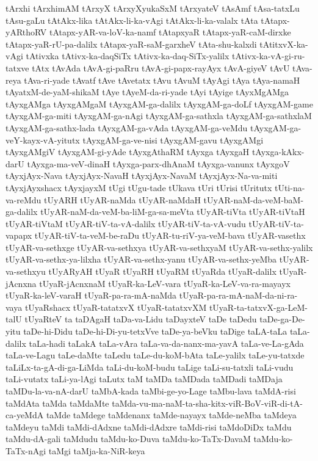 {tArxhi
tArxhimAM
tArxyX
tArxyXyukaSxM
tArxyateV
tAsAmf
tAsa-tatxLu
tAsu-gaLu
tAtAkx-lika
tAtAkx-li-ka-vAgi
tAtAkx-li-ka-valalx
tAta
tAtapx-yARthoRV
tAtapx-yAR-va-loV-ka-namf
tAtapxyaR
tAtapx-yaR-caM-dirxke
tAtapx-yaR-rU-pa-dalilx
tAtapx-yaR-saM-garxheV
tAta-shu-kalxdi
tAtitxvX-ka-vAgi
tAtivxka
tAtivx-ka-daqSiTx
tAtivx-ka-daq-SiTx-yalilx
tAtivx-ka-vA-gi-ru-tatxve
tAtx
tAvAda
tAvA-gi-paRru
tAvA-gi-papx-rayAyx
tAvA-giyeV
tAvU
tAva-reya
tAva-ri-yade
tAvatf
tAve
tAvetatx
tAvu
tAvuM
tAyAgi
tAya
tAya-namaH
tAyatxM-de-yaM-shikaM
tAye
tAyeM-da-ri-yade
tAyi
tAyige
tAyxMgAMga
tAyxgAMga
tAyxgAMgaM
tAyxgAM-ga-dalilx
tAyxgAM-ga-doLf
tAyxgAM-game
tAyxgAM-ga-miti
tAyxgAM-ga-nAgi
tAyxgAM-ga-sathxla
tAyxgAM-ga-sathxlaM
tAyxgAM-ga-sathx-lada
tAyxgAM-ga-vAda
tAyxgAM-ga-veMdu
tAyxgAM-ga-veY-kayx-vA-yitutx
tAyxgAM-ga-ve-nisi
tAyxgAM-gavu
tAyxgAMgi
tAyxgAMgiV
tAyxgAM-gi-yAde
tAyxgAthaRM
tAyxga
tAyxgaH
tAyxga-kAkx-darU
tAyxga-ma-veV-dinaH
tAyxga-parx-dhAnaM
tAyxga-vanunx
tAyxgoV
tAyxjAyx-Nava
tAyxjAyx-NavaH
tAyxjAyx-NavaM
tAyxjAyx-Na-va-miti
tAyxjAyxshacx
tAyxjayxM
tUgi
tUgu-tade
tUkava
tUri
tUrisi
tUritutx
tUti-na-va-reMdu
tUyARH
tUyAR-naMda
tUyAR-naMdaH
tUyAR-naM-da-veM-baM-ga-dalilx
tUyAR-naM-da-veM-ba-liM-ga-sa-meVta
tUyAR-tiVta
tUyAR-tiVtaH
tUyAR-tiVtaM
tUyAR-tiV-ta-vA-dalilx
tUyAR-tiV-ta-vA-vudu
tUyAR-tiV-ta-vapapx
tUyAR-tiV-ta-veM-be-raDu
tUyAR-tu-riV-ya-veM-bava
tUyAR-vasethx
tUyAR-va-sethxge
tUyAR-va-sethxya
tUyAR-va-sethxyaM
tUyAR-va-sethx-yalilx
tUyAR-va-sethx-ya-lilxha
tUyAR-va-sethx-yanu
tUyAR-va-sethx-yeMba
tUyAR-va-sethxyu
tUyARyAH
tUyaR
tUyaRH
tUyaRM
tUyaRda
tUyaR-dalilx
tUyaR-jAcnxna
tUyaR-jAcnxnaM
tUyaR-ka-LeV-vara
tUyaR-ka-LeV-va-ra-mayayx
tUyaR-ka-leV-varaH
tUyaR-pa-ra-mA-naMda
tUyaR-pa-ra-mA-naM-da-ni-ra-vaya
tUyaRshacx
tUyaR-tatatxvX
tUyaR-tatatxvXM
tUyaR-ta-tatxvX-ga-LeM-talU
tUyaRteV
ta
taDAgaH
taDa-va-Lidu
taDayxteV
taDe
taDedu
taDe-ga-De-yitu
taDe-hi-Didu
taDe-hi-Di-yu-tetxVve
taDe-ya-beVku
taDige
taLA-taLa
taLa-dalilx
taLa-hadi
taLakA
taLa-vAra
taLa-va-da-nanx-ma-yavA
taLa-ve-La-gAda
taLa-ve-Lagu
taLe-daMte
taLedu
taLe-du-koM-bAta
taLe-yalilx
taLe-yu-tatxde
taLiLx-ta-gA-di-ga-LiMda
taLi-du-koM-budu
taLige
taLi-su-tatxli
taLi-vudu
taLi-vutatx
taLi-ya-lAgi
taLutx
taM
taMDa
taMDada
taMDadi
taMDaja
taMDu-la-va-nA-darU
taMbA-kada
taMbi-ge-yo-Lage
taMbu-lava
taMdA-risi
taMdAta
taMda
taMdaMte
taMda-vu-ma-naM-ta-sha-kitx-viR-BoV-viR-di-tA-ca-yeMdA
taMde
taMdege
taMdenanx
taMde-nayayx
taMde-neMba
taMdeya
taMdeyu
taMdi
taMdi-dAdxne
taMdi-dAdxre
taMdi-risi
taMdoDiDx
taMdu
taMdu-dA-gali
taMdudu
taMdu-ko-Duva
taMdu-ko-TaTx-DavaM
taMdu-ko-TaTx-nAgi
taMgi
taMja-ka-NiR-keya
}
